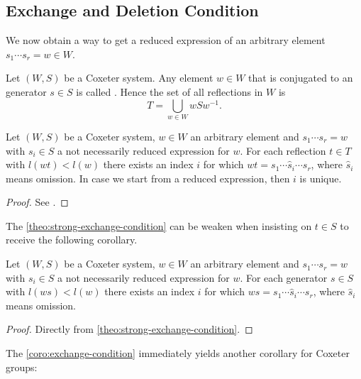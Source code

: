\subsection{Exchange and Deletion Condition}
\label{sec:coxeter-groups-exchange-deletion-condition}

We now obtain a way to get a reduced expression of an arbitrary element $s_1 \cdots s_r = w \in W$.

\begin{defi}
	Let $(W,S)$ be a Coxeter system. Any element $w \in W$ that is conjugated to an generator $s \in S$ is called . Hence the set of all reflections in $W$ is
	$$ T = \bigcup_{w \in W} wSw^{-1}. $$
\end{defi}

\begin{theo}[Strong Exchange Condition]
	Let $(W,S)$ be a Coxeter system, $w \in W$ an arbitrary element and ${s_1 \cdots s_r = w}$ with $s_i \in S$ a not necessarily reduced expression for $w$. For each reflection $t \in T$ with $l(wt) < l(w)$ there exists an index $i$ for which $wt = s_1 \cdots \hat s_i \cdots s_r$, where $\hat s_i$ means omission. In case we start from a reduced expression, then $i$ is unique.

	\begin{proof}
		See \cite[Theorem 5.8]{humphreys:coxeter}.
	\end{proof}
\end{theo}

The \ref{theo:strong-exchange-condition} can be weaken when insisting on $t \in S$ to receive the following corollary.

\begin{coro}
	Let $(W,S)$ be a Coxeter system, $w \in W$ an arbitrary element and ${s_1 \cdots s_r = w}$ with $s_i \in S$ a not necessarily reduced expression for $w$. For each generator $s \in S$ with $l(ws) < l(w)$ there exists an index $i$ for which $ws = s_1 \cdots \hat s_i \cdots s_r$, where $\hat s_i$ means omission.

	\begin{proof}
		Directly from \ref{theo:strong-exchange-condition}.
	\end{proof}
\end{coro}

The \ref{coro:exchange-condition} immediately yields another corollary for Coxeter groups:

